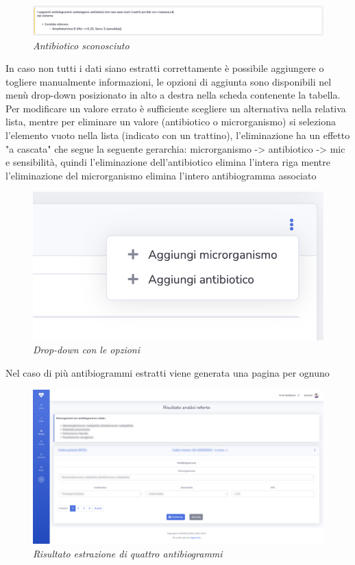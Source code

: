 \begin{figure}[h!]
	\centering
	\includegraphics[width=.99\columnwidth]{images/static_missing_antib.png}
	\caption{\textit{Antibiotico sconosciuto}}
	\label{fig:missing_anti}
\end{figure}
\newpage
In caso non tutti i dati siano estratti correttamente è possibile aggiungere o togliere manualmente informazioni, le opzioni di aggiunta sono disponibili nel menù drop-down posizionato in alto a destra nella scheda contenente la tabella.
Per modificare un valore errato è sufficiente scegliere un alternativa nella relativa lista, mentre per eliminare un valore (antibiotico o microrganismo) si seleziona l'elemento vuoto nella lista (indicato con un trattino), l'eliminazione ha un effetto 
"a cascata" che segue la seguente gerarchia: microrganismo -> antibiotico -> mic e sensibilità, quindi l'eliminazione dell'antibiotico elimina l'intera riga mentre l'eliminazione del microrganismo elimina l'intero antibiogramma associato
\begin{figure}[h!]
	\centering
	\includegraphics[width=.99\columnwidth]{images/new_object.png}
	\caption{\textit{Drop-down con le opzioni}}
	\label{fig:new_object}
\end{figure}
\newpage
Nel caso di più antibiogrammi estratti viene generata una pagina per ognuno 
\begin{figure}[h!]
	\centering
	\includegraphics[width=.99\columnwidth]{images/result_multi.png}
	\caption{\textit{Risultato estrazione di quattro antibiogrammi}}
	\label{fig:result_multi}
\end{figure}
\newpage
